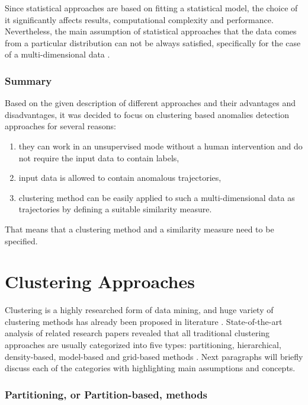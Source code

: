 Since statistical approaches are based on fitting a statistical model, the choice of it significantly affects results, computational complexity and performance. Nevertheless, the main assumption of statistical approaches that the data comes from a particular distribution can not be always satisfied, specifically for the case of a multi-dimensional data \cite{article:15_survey_ad}.

\subsubsection{Summary}

Based on the given description of different approaches and their advantages and disadvantages, it was decided to focus on clustering based anomalies detection approaches for several reasons:
 
\begin{enumerate}[label=\arabic*)]
	\setlength\itemsep{0em}
	\item they can work in an unsupervised mode without a human intervention and do not require the input data to contain labels,
	\item input data is allowed to contain anomalous trajectories,
	\item clustering method can be easily applied to such a multi-dimensional data as trajectories by defining a suitable similarity measure.
\end{enumerate}

That means that a clustering method and a similarity measure need to be specified.

\section{Clustering Approaches}

Clustering is a highly researched form of data mining, and huge variety of clustering methods has already been proposed in literature \cite{article:8_review_mot_cl_alg}. State-of-the-art analysis of related research papers revealed that all traditional clustering approaches are usually categorized into five types: partitioning, hierarchical, density-based, model-based and grid-based methods \cite{article:5_survey_tbsa}\cite{article:8_review_mot_cl_alg}. Next paragraphs will briefly discuss each of the categories with highlighting main assumptions and concepts.

\subsubsection{Partitioning, or Partition-based, methods}

